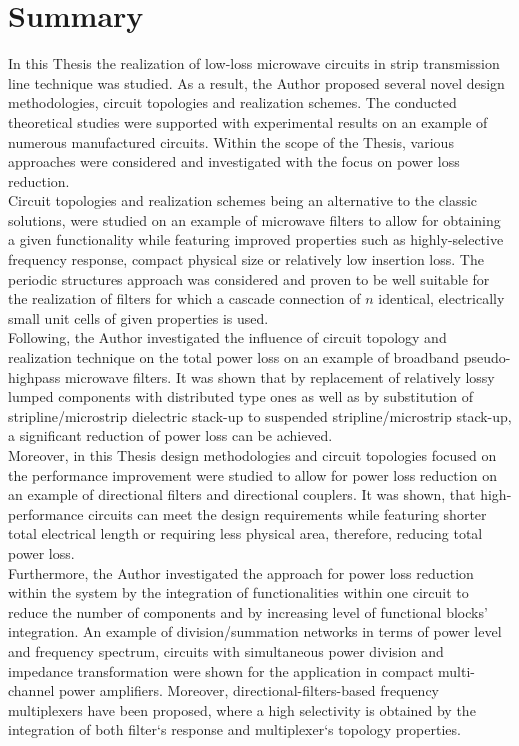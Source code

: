 \chapter{Summary}\label{summary}

\indent In this Thesis the realization of low-loss microwave circuits in strip transmission line technique was studied. As a result, the Author proposed several novel design methodologies, circuit topologies and realization schemes. The conducted theoretical studies were supported with experimental results on an example of numerous manufactured circuits. Within the scope of the Thesis, various approaches were considered and investigated with the focus on power loss reduction.
\\
\indent Circuit topologies and realization schemes being an alternative to the  classic solutions, were studied on an example of microwave filters to allow for obtaining a given functionality while featuring improved properties such as highly-selective frequency response, compact physical size or relatively low insertion loss. The periodic structures approach was considered and proven to be well suitable for the realization of filters for which a cascade connection of $n$ identical, electrically small unit cells of given properties is used.
\\
\indent Following, the Author investigated the influence of circuit topology and realization technique on the total power loss on an example of broadband pseudo-highpass microwave filters. It was shown that by replacement of relatively lossy lumped components with distributed type ones as well as by substitution of stripline/microstrip dielectric stack-up to suspended stripline/microstrip stack-up, a significant reduction of power loss can be achieved.
\\
\indent Moreover, in this Thesis design methodologies and circuit topologies focused on the performance improvement were studied to allow for power loss reduction on an example of directional filters and directional couplers. It was shown, that high-performance circuits can meet the design requirements while featuring shorter total electrical length or requiring less physical area, therefore, reducing total power loss.
\\
\indent Furthermore, the Author investigated the approach for power loss reduction within the system by the integration of functionalities within one circuit to reduce the number of components and by increasing level of functional blocks' integration. An example of division/summation networks in terms of power level and frequency spectrum, circuits with simultaneous power division and impedance transformation were shown for the application in compact multi-channel power amplifiers. Moreover, directional-filters-based frequency multiplexers have been proposed, where a high selectivity is obtained by the integration of both filter`s response and multiplexer`s topology properties.
